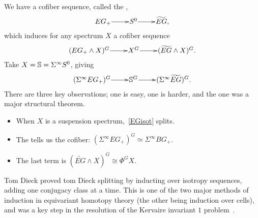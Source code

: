 We have a cofiber sequence, called the ,
\[\xymatrix@1{
	EG_+\ar[r] & S^0\ar[r] & \widetilde{EG},
}\]
which induces for any spectrum $X$ a cofiber sequence
\begin{equation}
\label{EGisot}
\xymatrix@1{
	(EG_+\wedge X)^G\ar[r] & X^G\ar[r] & (\widetilde{EG}\wedge X)^G.
}
\end{equation}
Take $X = \mathbb S = \Sigma^\infty S^0$, giving
\[\xymatrix@1{
	(\Sigma^\infty EG_+)^G\ar[r] & \Sph^G\ar[r] & (\Sigma^\infty\widetilde{EG})^G.
}\]
There are three key observations; one is easy, one is harder, and the one was a major structural theorem.
\begin{itemize}
	\item When $X$ is a suspension spectrum,~\eqref{EGisot} splits.
	\item The  tells us the cofiber: $(\Sigma^\infty EG_+)^G\simeq\Sigma^\infty BG_+$.
	\item The last term is $(\widetilde{EG}\wedge X)^G\cong\Phi^G X$.
\end{itemize}
Tom Dieck proved tom Dieck splitting by inducting over isotropy sequences, adding one conjugacy class at a time.
This is one of the two major methods of induction in equivariant homotopy theory (the other being induction over
cells), and was a key step in the resolution of the Kervaire invariant $1$ problem~\cite{HHR}.
